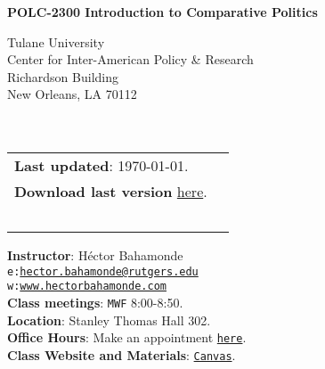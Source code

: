 \documentclass[letterpaper]{article}
\def\name{POLC-2300 Introduction to Comparative Politics}
\begin{document}

\centerline{\huge \bf \name}

\vspace{0.25in}

\begin{minipage}{0.45\linewidth}
  Tulane University \\
  Center for Inter-American Policy \& Research \\
  Richardson Building \\
  New Orleans, LA 70112\\
  \\
  \\

\end{minipage}
\hspace{4cm}\begin{minipage}{0.45\linewidth}
  \begin{tabular}{ll}
{\bf Last updated}: \today. \\
 {\bf Download last version} \href{https://github.com/hbahamonde/Comparative_Politics_UGRAD/raw/master/Bahamonde_Comparative_Politics_Syllabus_UGRAD.pdf}{here}.\\
   {\bf {\color{red}{\scriptsize Not intended as a definitive version}}} %
    \\
    \\
    \\
    \\
    \\
  \end{tabular}
\end{minipage}

\vspace{-5mm}
{\bf Instructor}: H\'ector Bahamonde\\
\texttt{e:}\href{mailto:hector.bahamonde@rutgers.edu}{\texttt{hector.bahamonde@rutgers.edu}}\\
\texttt{w:}\href{http://www.hectorbahamonde.com}{\texttt{www.hectorbahamonde.com}}\\
{\bf Class meetings}: \texttt{MWF} 8:00-8:50.\\
{\bf Location}: Stanley Thomas Hall 302.\\
{\bf Office Hours}: Make an appointment \href{https://calendly.com/bahamonde/officehours}{\texttt{here}}.\\
{\bf Class Website and Materials}: \href{https://tulane.instructure.com/courses/2170180}{\texttt{Canvas}}.
\end{document}
